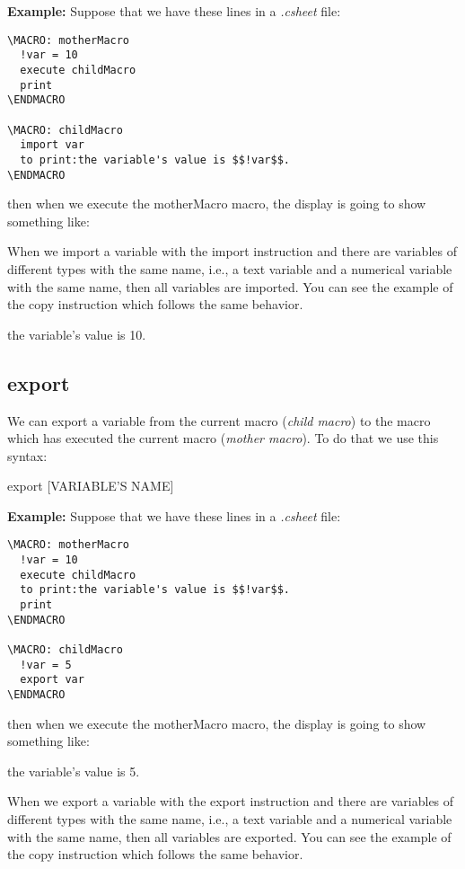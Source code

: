 \documentclass[11pt,a4paper,openright,oneside]{book}
\newenvironment{ex}
{
  \setlength{\parindent}{0cm}
  \large \textbf{Example:} \normalsize 
}
{}
\begin{document}
\begin{ex} Suppose that we have these lines in a \textit{.csheet} file:
  \begin{lstlisting}
\MACRO: motherMacro
  !var = 10
  execute childMacro
  print
\ENDMACRO

\MACRO: childMacro
  import var
  to print:the variable's value is $$!var$$.
\ENDMACRO
  \end{lstlisting}
then when we execute the \textsf{motherMacro} macro, the display is going to show something like:
\vspace{5px}

When we import a variable with the \textsf{import} instruction and there are variables of different types with the same name, i.e., a text variable and a numerical variable with the same name, then all variables are imported. You can see the example of the \textsf{copy} instruction which follows the same behavior.

\textsf{the variable's value is 10.} \\
\end{ex}

\subsection{\textsf{export}}

We can export a variable from the current macro (\textit{child macro}) to the macro which has executed the current macro (\textit{mother macro}). To do that we use this syntax:
\begin{center} \textsf{export \textsc{\scriptsize[VARIABLE'S NAME]}} \end{center}

\begin{ex} Suppose that we have these lines in a \textit{.csheet} file:
  \begin{lstlisting}
\MACRO: motherMacro
  !var = 10
  execute childMacro
  to print:the variable's value is $$!var$$.
  print
\ENDMACRO

\MACRO: childMacro
  !var = 5
  export var
\ENDMACRO
  \end{lstlisting}
then when we execute the \textsf{motherMacro} macro, the display is going to show something like:
\vspace{5px}

\textsf{the variable's value is 5.}
  
\end{ex}

When we export a variable with the \textsf{export} instruction and there are variables of different types with the same name, i.e., a text variable and a numerical variable with the same name, then all variables are exported. You can see the example of the \textsf{copy} instruction which follows the same behavior.
\end{document}
